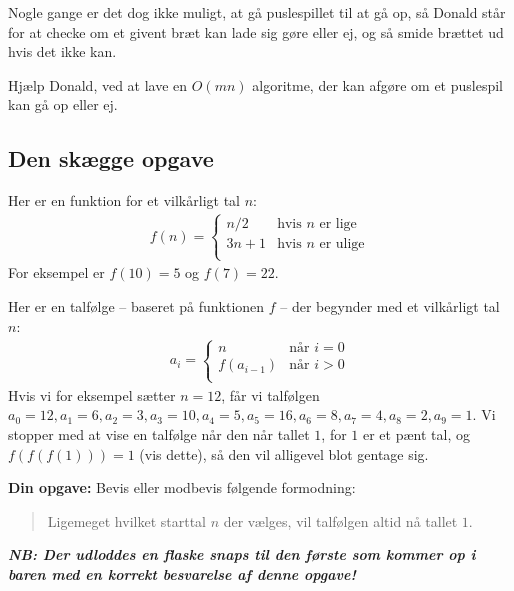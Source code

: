 Nogle gange er det dog ikke muligt, at gå puslespillet til at gå op, så
Donald står for at checke om et givent bræt kan lade sig gøre eller ej, og
så smide brættet ud hvis det ikke kan.

Hjælp Donald, ved at lave en $O(mn)$ algoritme, der kan afgøre om et puslespil
kan gå op eller ej.



\newpage

\subsection{Den skægge opgave}


Her er en funktion for et vilkårligt tal $n$:
\begin{align*}
f(n) = \begin{cases}
n/2 &\text{hvis }n\text{ er lige}\\
3n + 1 &\text{hvis }n\text{ er ulige}\\
\end{cases}
\end{align*}
For eksempel er $f(10) = 5$ og $f(7) = 22$.

Her er en talfølge -- baseret på funktionen $f$ -- der begynder med et
vilkårligt tal $n$:
\begin{align*}
a_i = \begin{cases}
n &\text{når }i = 0\\
f(a_{i - 1}) &\text{når }i > 0\\
\end{cases}
\end{align*}
Hvis vi for eksempel sætter $n = 12$, får vi talfølgen
$a_0 = 12, a_1 = 6, a_2 = 3, a_3 = 10, a_4 = 5, a_5 = 16, a_6 = 8, a_7 = 4, a_8
= 2, a_9 = 1$.  Vi stopper med at vise en talfølge når den når tallet $1$, for
$1$ er et pænt tal, og $f(f(f(1))) = 1$ (vis dette), så den vil alligevel blot
gentage sig.

\textbf{Din opgave:} Bevis eller modbevis følgende formodning:
\begin{quote}
Ligemeget hvilket starttal $n$ der vælges, vil talfølgen altid nå tallet $1$.
\end{quote}

\textbf{\emph{NB: Der udloddes en flaske snaps til den første som kommer op i
baren med en korrekt besvarelse af denne opgave!}}
